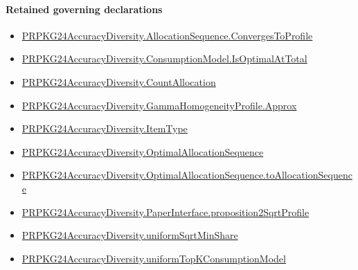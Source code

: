 \documentclass[10pt]{article}
\begin{document}
\paragraph{Retained governing declarations}
\begin{itemize}\raggedright
\item \hyperlink{governing-declaration-c2104a34d19d06bb}{PRPKG24\allowbreak{}Accuracy\allowbreak{}Diversity.\allowbreak{}Allocation\allowbreak{}Sequence.\allowbreak{}Converges\allowbreak{}To\allowbreak{}Profile}
\item \hyperlink{governing-declaration-dce768684c24aad2}{PRPKG24\allowbreak{}Accuracy\allowbreak{}Diversity.\allowbreak{}Consumption\allowbreak{}Model.\allowbreak{}Is\allowbreak{}Optimal\allowbreak{}At\allowbreak{}Total}
\item \hyperlink{governing-declaration-4fbd8fa467bd5d78}{PRPKG24\allowbreak{}Accuracy\allowbreak{}Diversity.\allowbreak{}Count\allowbreak{}Allocation}
\item \hyperlink{governing-declaration-5fc487eda7159512}{PRPKG24\allowbreak{}Accuracy\allowbreak{}Diversity.\allowbreak{}Gamma\allowbreak{}Homogeneity\allowbreak{}Profile.\allowbreak{}Approx}
\item \hyperlink{governing-declaration-562ef32e180a12be}{PRPKG24\allowbreak{}Accuracy\allowbreak{}Diversity.\allowbreak{}Item\allowbreak{}Type}
\item \hyperlink{governing-declaration-98821e74d0c4230b}{PRPKG24\allowbreak{}Accuracy\allowbreak{}Diversity.\allowbreak{}Optimal\allowbreak{}Allocation\allowbreak{}Sequence}
\item \hyperlink{governing-declaration-5624e0445b0771dc}{PRPKG24\allowbreak{}Accuracy\allowbreak{}Diversity.\allowbreak{}Optimal\allowbreak{}Allocation\allowbreak{}Sequence.\allowbreak{}to\allowbreak{}Allocation\allowbreak{}Sequence}
\item \hyperlink{governing-declaration-be87d5d252a4aecb}{PRPKG24\allowbreak{}Accuracy\allowbreak{}Diversity.\allowbreak{}Paper\allowbreak{}Interface.\allowbreak{}proposition2\allowbreak{}Sqrt\allowbreak{}Profile}
\item \hyperlink{governing-declaration-39062ebc150368eb}{PRPKG24\allowbreak{}Accuracy\allowbreak{}Diversity.\allowbreak{}uniform\allowbreak{}Sqrt\allowbreak{}Min\allowbreak{}Share}
\item \hyperlink{governing-declaration-369db72f8d2a9054}{PRPKG24\allowbreak{}Accuracy\allowbreak{}Diversity.\allowbreak{}uniform\allowbreak{}Top\allowbreak{}K\allowbreak{}Consumption\allowbreak{}Model}
\end{itemize}
\end{document}

